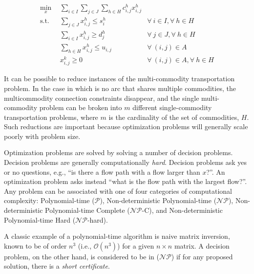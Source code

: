 \begin{subequations}\label{eqs:MCTP}
  \begin{align}
    \min_{x} \:\: & 
    \sum_{i \in I}\sum_{j \in J}\sum_{h \in H} c_{i,j}^{h} x_{i,j}^{h}
    & \label{eqs:MCTP_obj} \\
    \text{s.t.} \:\: &
    \sum_{j \in J} x_{i,j}^{h} \leq s_{i}^{h}
    &
    \forall \: i \in I, \forall \: h \in H \label{eqs:MCTP_sup} \\
    &
    \sum_{i \in I} x_{i,j}^{h} \geq d_{j}^{h}
    & 
    \forall \: j \in J, \forall \: h \in H \label{eqs:MCTP_dem} \\
    &
    \sum_{h \in H} x_{i,j}^{h} \leq u_{i,j}
    & 
    \forall \: (i, j) \in A \label{eqs:MCTP_cap} \\
    &
    x_{i,j}^{k} \geq 0
    &
    \forall \: (i, j) \in A, \forall \: h \in H \label{eqs:MCTP_x}
  \end{align}
\end{subequations}

It can be possible to reduce instances of the multi-commodity transportation
problem. In the case in which is no arc that shares multiple commodities, the
multicommodity connection constraints disappear, and the single multi-commodity
problem can be broken into $m$ different single-commodity transportation
problems, where $m$ is the cardinality of the set of commodities, $H$. Such
reductions are important because optimization problems will generally scale
poorly with problem size.

Optimization problems are solved by solving a number of decision
problems. Decision problems are generally computationally
\textit{hard}. Decision problems ask yes or no questions, e.g., ``is there a
flow path with a flow larger than $x$?''. An optimization problem asks instead
``what is the flow path with the largest flow?''. Any problem can be associated
with one of four categories of computational complexity: Polynomial-time
($\mathcal{P}$), Non-deterministic Polynomial-time ($\mathcal{NP}$),
Non-deterministic Polynomial-time Complete ($\mathcal{NP}$-C), and
Non-deterministic Polynomial-time Hard ($\mathcal{NP}$-hard). 

A classic example of a polynomial-time algorithm is naive matrix inversion,
known to be of order $n^3$ (i.e., $\mathcal{O}(n^3)$) for a given $n \times n$
matrix. A decision problem, on the other hand, is considered to be in
($\mathcal{NP}$) if for any proposed solution, there is a \textit{short
  certificate}.

